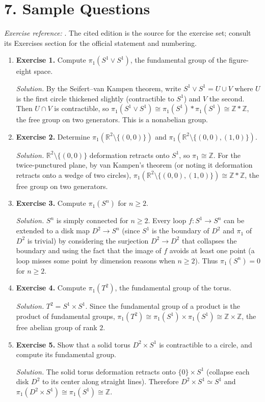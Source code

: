 \section*{7. Sample Questions}
\emph{Exercise reference:} \cite{homotopy_theory_ref1}. The cited edition is the source for the exercise set; consult its Exercises section for the official statement and numbering.
\begin{enumerate}[leftmargin=*,itemsep=0.9em]
\item \textbf{Exercise 1.} Compute $\pi_1(S^1\vee S^1)$, the fundamental group of the figure-eight space.

\emph{Solution.} By the Seifert--van Kampen theorem, write $S^1\vee S^1=U\cup V$ where $U$ is the first circle thickened slightly (contractible to $S^1$) and $V$ the second. Then $U\cap V$ is contractible, so $\pi_1(S^1\vee S^1)\cong\pi_1(S^1)*\pi_1(S^1)\cong\mathbb{Z}*\mathbb{Z}$, the free group on two generators. This is a nonabelian group.

\item \textbf{Exercise 2.} Determine $\pi_1(\mathbb{R}^2\setminus\{(0,0)\})$ and $\pi_1(\mathbb{R}^2\setminus\{(0,0),(1,0)\})$.

\emph{Solution.} $\mathbb{R}^2\setminus\{(0,0)\}$ deformation retracts onto $S^1$, so $\pi_1\cong\mathbb{Z}$. For the twice-punctured plane, by van Kampen's theorem (or noting it deformation retracts onto a wedge of two circles), $\pi_1(\mathbb{R}^2\setminus\{(0,0),(1,0)\})\cong\mathbb{Z}*\mathbb{Z}$, the free group on two generators.

\item \textbf{Exercise 3.} Compute $\pi_1(S^n)$ for $n\geq 2$.

\emph{Solution.} $S^n$ is simply connected for $n\geq 2$. Every loop $f:S^1\to S^n$ can be extended to a disk map $D^2\to S^n$ (since $S^1$ is the boundary of $D^2$ and $\pi_1$ of $D^2$ is trivial) by considering the surjection $D^2\to D^2$ that collapses the boundary and using the fact that the image of $f$ avoids at least one point (a loop misses some point by dimension reasons when $n\geq 2$). Thus $\pi_1(S^n)=0$ for $n\geq 2$.

\item \textbf{Exercise 4.} Compute $\pi_1(T^2)$, the fundamental group of the torus.

\emph{Solution.} $T^2=S^1\times S^1$. Since the fundamental group of a product is the product of fundamental groups, $\pi_1(T^2)\cong\pi_1(S^1)\times\pi_1(S^1)\cong\mathbb{Z}\times\mathbb{Z}$, the free abelian group of rank $2$.

\item \textbf{Exercise 5.} Show that a solid torus $D^2\times S^1$ is contractible to a circle, and compute its fundamental group.

\emph{Solution.} The solid torus deformation retracts onto $\{0\}\times S^1$ (collapse each disk $D^2$ to its center along straight lines). Therefore $D^2\times S^1\simeq S^1$ and $\pi_1(D^2\times S^1)\cong\pi_1(S^1)\cong\mathbb{Z}$.

\end{enumerate}
